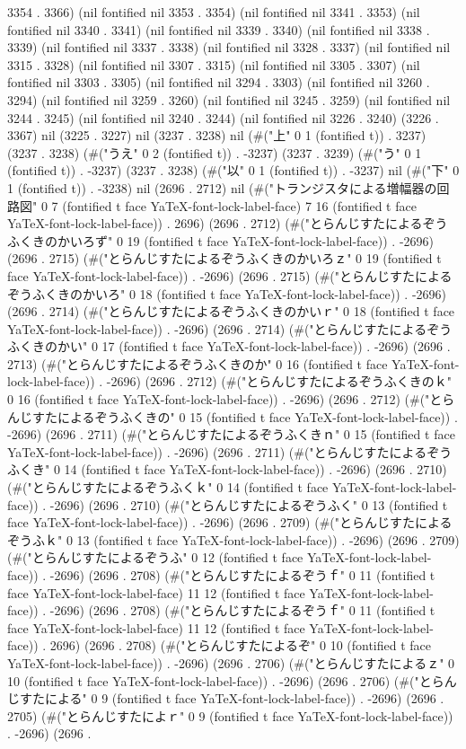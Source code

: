 3354 . 3366) (nil fontified nil 3353 . 3354) (nil fontified nil 3341 . 3353) (nil fontified nil 3340 . 3341) (nil fontified nil 3339 . 3340) (nil fontified nil 3338 . 3339) (nil fontified nil 3337 . 3338) (nil fontified nil 3328 . 3337) (nil fontified nil 3315 . 3328) (nil fontified nil 3307 . 3315) (nil fontified nil 3305 . 3307) (nil fontified nil 3303 . 3305) (nil fontified nil 3294 . 3303) (nil fontified nil 3260 . 3294) (nil fontified nil 3259 . 3260) (nil fontified nil 3245 . 3259) (nil fontified nil 3244 . 3245) (nil fontified nil 3240 . 3244) (nil fontified nil 3226 . 3240) (3226 . 3367) nil (3225 . 3227) nil (3237 . 3238) nil (#("上" 0 1 (fontified t)) . 3237) (3237 . 3238) (#("うえ" 0 2 (fontified t)) . -3237) (3237 . 3239) (#("う" 0 1 (fontified t)) . -3237) (3237 . 3238) (#("以" 0 1 (fontified t)) . -3237) nil (#("下" 0 1 (fontified t)) . -3238) nil (2696 . 2712) nil (#("トランジスタによる増幅器の回路図" 0 7 (fontified t face YaTeX-font-lock-label-face) 7 16 (fontified t face YaTeX-font-lock-label-face)) . 2696) (2696 . 2712) (#("とらんじすたによるぞうふくきのかいろず" 0 19 (fontified t face YaTeX-font-lock-label-face)) . -2696) (2696 . 2715) (#("とらんじすたによるぞうふくきのかいろｚ" 0 19 (fontified t face YaTeX-font-lock-label-face)) . -2696) (2696 . 2715) (#("とらんじすたによるぞうふくきのかいろ" 0 18 (fontified t face YaTeX-font-lock-label-face)) . -2696) (2696 . 2714) (#("とらんじすたによるぞうふくきのかいｒ" 0 18 (fontified t face YaTeX-font-lock-label-face)) . -2696) (2696 . 2714) (#("とらんじすたによるぞうふくきのかい" 0 17 (fontified t face YaTeX-font-lock-label-face)) . -2696) (2696 . 2713) (#("とらんじすたによるぞうふくきのか" 0 16 (fontified t face YaTeX-font-lock-label-face)) . -2696) (2696 . 2712) (#("とらんじすたによるぞうふくきのｋ" 0 16 (fontified t face YaTeX-font-lock-label-face)) . -2696) (2696 . 2712) (#("とらんじすたによるぞうふくきの" 0 15 (fontified t face YaTeX-font-lock-label-face)) . -2696) (2696 . 2711) (#("とらんじすたによるぞうふくきｎ" 0 15 (fontified t face YaTeX-font-lock-label-face)) . -2696) (2696 . 2711) (#("とらんじすたによるぞうふくき" 0 14 (fontified t face YaTeX-font-lock-label-face)) . -2696) (2696 . 2710) (#("とらんじすたによるぞうふくｋ" 0 14 (fontified t face YaTeX-font-lock-label-face)) . -2696) (2696 . 2710) (#("とらんじすたによるぞうふく" 0 13 (fontified t face YaTeX-font-lock-label-face)) . -2696) (2696 . 2709) (#("とらんじすたによるぞうふｋ" 0 13 (fontified t face YaTeX-font-lock-label-face)) . -2696) (2696 . 2709) (#("とらんじすたによるぞうふ" 0 12 (fontified t face YaTeX-font-lock-label-face)) . -2696) (2696 . 2708) (#("とらんじすたによるぞうｆ" 0 11 (fontified t face YaTeX-font-lock-label-face) 11 12 (fontified t face YaTeX-font-lock-label-face)) . -2696) (2696 . 2708) (#("とらんじすたによるぞうｆ" 0 11 (fontified t face YaTeX-font-lock-label-face) 11 12 (fontified t face YaTeX-font-lock-label-face)) . 2696) (2696 . 2708) (#("とらんじすたによるぞ" 0 10 (fontified t face YaTeX-font-lock-label-face)) . -2696) (2696 . 2706) (#("とらんじすたによるｚ" 0 10 (fontified t face YaTeX-font-lock-label-face)) . -2696) (2696 . 2706) (#("とらんじすたによる" 0 9 (fontified t face YaTeX-font-lock-label-face)) . -2696) (2696 . 2705) (#("とらんじすたによｒ" 0 9 (fontified t face YaTeX-font-lock-label-face)) . -2696) (2696 . 